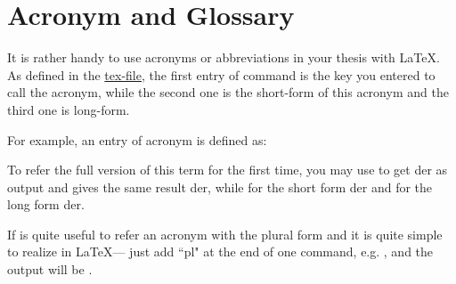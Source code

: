 \chapter{Acronym and Glossary}
	
\graphicspath{ {graphics/Chapter6/} }
	
It is rather handy to use acronyms or abbreviations in your thesis with \LaTeX. As defined in the \href{acronyms/acronyms.tex}{tex-file}, the first entry of {\color{blue}{\verb|\newacronym|}} command is the key you entered to call the acronym, while the second one is the short-form of this acronym and the third one is long-form.
	
For example, an entry of acronym is defined as:
	
{}
	
To refer the full version of this term for the first time, you may use {} to get \colorbox{yellow!60}{\gls{der}} as output and {} gives the same result \colorbox{yellow!60}{\acrfull{der}}, while {} for the short form \colorbox{yellow!60}{\acrshort{der}} and {} for the long form \colorbox{yellow!60}{\acrlong{der}}.
	
If is quite useful to refer an acronym with the plural form and it is quite simple to realize in \LaTeX --- just add ``pl" at the end of one command, e.g. {}, and the output will be \colorbox{yellow!60}{}.